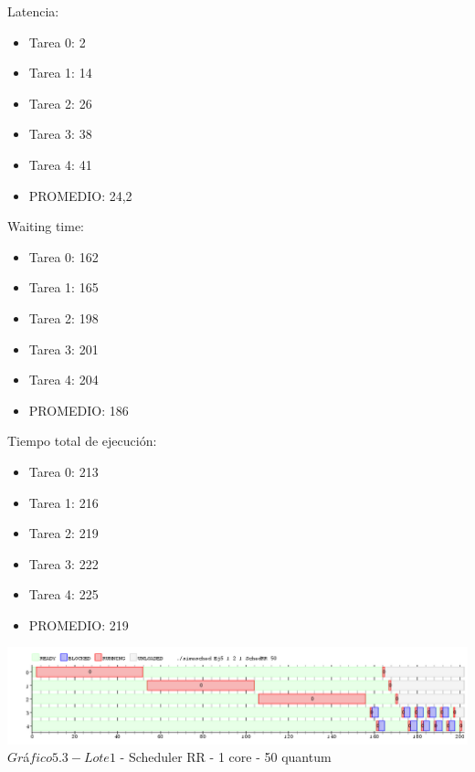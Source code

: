 \indent Latencia:\
\begin{itemize}
 \item Tarea 0: 2
 \item Tarea 1: 14
 \item Tarea 2: 26
 \item Tarea 3: 38
 \item Tarea 4: 41
 \item PROMEDIO: 24,2
\end{itemize}
\indent Waiting time:\
\begin{itemize}
 \item Tarea 0: 162
 \item Tarea 1: 165
 \item Tarea 2: 198
 \item Tarea 3: 201
 \item Tarea 4: 204
 \item PROMEDIO: 186
\end{itemize}
\indent Tiempo total de ejecuci\'{o}n:\
\begin{itemize}
 \item Tarea 0: 213
 \item Tarea 1: 216
 \item Tarea 2: 219
 \item Tarea 3: 222
 \item Tarea 4: 225
 \item PROMEDIO: 219
\end{itemize}

\begin{center}
  	\includegraphics[width=450pt]{./Test/ej5_50.png}
	  {$Gr$\'a$fico 5.3 - Lote 1$ - Scheduler RR - 1 core - 50 quantum}	
\end{center}

